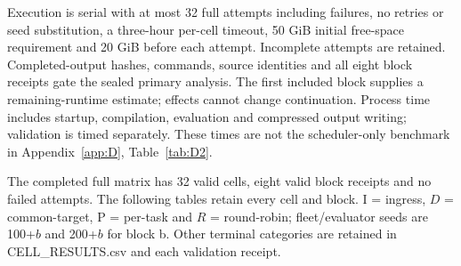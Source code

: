 \documentclass[12pt,a4paper]{article}
\begin{document}
Execution is serial with at most 32 full attempts including failures, no retries or seed substitution, a three-hour per-cell timeout, 50 GiB initial free-space requirement and 20 GiB before each attempt. Incomplete attempts are retained. Completed-output hashes, commands, source identities and all eight block receipts gate the sealed primary analysis. The first included block supplies a remaining-runtime estimate; effects cannot change continuation. Process time includes startup, compilation, evaluation and compressed output writing; validation is timed separately. These times are not the scheduler-only benchmark in Appendix~\ref{app:D}, Table~\ref{tab:D2}.

The completed full matrix has 32 valid cells, eight valid block receipts and no failed attempts. The following tables retain every cell and block. I = ingress, $D$ = common-target, P = per-task and $R$ = round-robin; fleet/evaluator seeds are 100+$b$ and 200+$b$ for block b. Other terminal categories are retained in CELL\_RESULTS.csv and each validation receipt.
\end{document}
